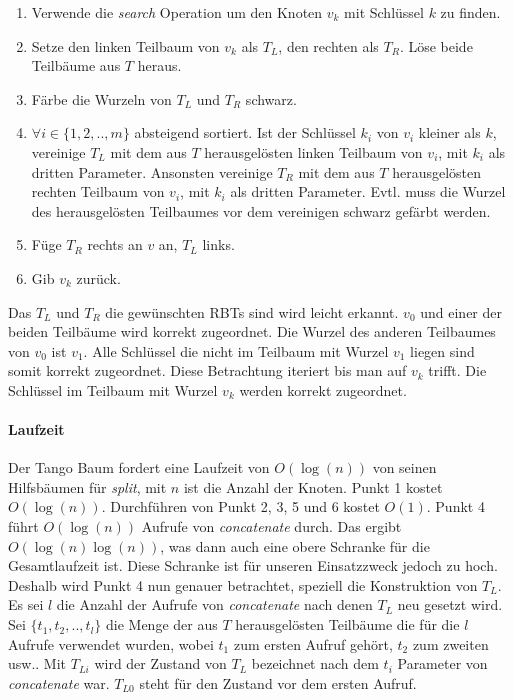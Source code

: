 \documentclass[a4paper,12pt]{article}
\begin{document}
\begin{enumerate}
	\item Verwende die \textit{search} Operation um den Knoten $v_k$ mit Schlüssel $k$ zu finden.
	\item Setze den linken Teilbaum von $v_k$ als $T_L$, den rechten als $T_R$. Löse beide Teilbäume aus $T$ heraus.
	\item Färbe die Wurzeln von $T_L$ und $T_R$ schwarz.
	\item $\forall i \in \{1,2,..,m\}$ absteigend sortiert. Ist der Schlüssel $k_i$ von $v_i$ kleiner als $k$, vereinige $T_L$ mit dem aus $T$ herausgelösten linken Teilbaum von $v_i$, mit  $k_i$ als dritten Parameter. Ansonsten vereinige $T_R$ mit dem aus $T$ herausgelösten rechten Teilbaum von $v_i$, mit  $k_i$ als dritten Parameter. Evtl. muss die Wurzel des herausgelösten Teilbaumes vor dem vereinigen schwarz gefärbt werden. 
	\item Füge $T_R$ rechts an $v$ an, $T_L$ links.
	\item Gib $v_k$ zurück.
\end{enumerate}   
Das $T_L$ und $T_R$ die gewünschten RBTs sind wird leicht erkannt. $v_0$ und einer der beiden Teilbäume wird korrekt zugeordnet. Die Wurzel des anderen Teilbaumes von $v_0$ ist $v_{1}$. Alle Schlüssel die nicht im Teilbaum mit Wurzel $v_{1}$ liegen sind somit korrekt zugeordnet. Diese Betrachtung iteriert bis man auf $v_k$ trifft. Die Schlüssel im Teilbaum mit Wurzel $v_k$ werden korrekt zugeordnet. 

\paragraph{Laufzeit}
Der Tango Baum fordert eine Laufzeit von $O(\log(n))$ von seinen Hilfsbäumen für \textit{split}, mit $n$ ist die Anzahl der Knoten. Punkt 1 kostet $O(\log(n))$. Durchführen von Punkt 2, 3, 5 und 6 kostet $O(1)$. Punkt 4 führt $O(\log (n))$ Aufrufe von \textit{concatenate} durch. Das ergibt $O(\log (n) \log (n))$, was dann auch eine obere Schranke für die Gesamtlaufzeit ist. Diese Schranke ist für unseren Einsatzzweck jedoch zu hoch.\\ Deshalb wird Punkt 4 nun genauer betrachtet, speziell die Konstruktion von $T_L$. Es sei $l$ die Anzahl der Aufrufe von \textit{concatenate} nach denen $T_L$ neu gesetzt wird. Sei $\{t_1,t_2,..,t_l\}$ die Menge der aus $T$ herausgelösten Teilbäume die für die $l$ Aufrufe verwendet wurden, wobei $t_1$ zum ersten Aufruf gehört, $t_2$ zum zweiten usw.. Mit $T_{Li}$ wird der Zustand von $T_L$ bezeichnet nach dem $t_i$ Parameter von \textit{concatenate} war.  $T_{L0}$ steht für den Zustand vor dem ersten Aufruf.\\
\end{document}
